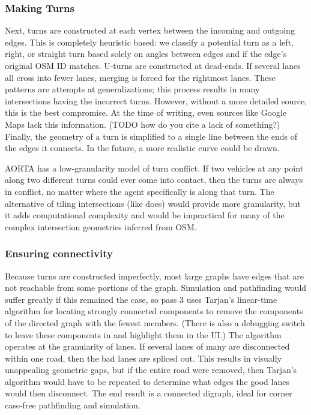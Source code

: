 \documentclass[letterpaper, 10 pt, conference]{ieeeconf}  %
\begin{document}
\subsubsection{Making Turns}

Next, turns are constructed at each vertex between the incoming and outgoing
edges. This is completely heuristic based: we classify a potential turn as a
left, right, or straight turn based solely on angles between edges and if the
edge's original OSM ID matches. U-turns are constructed at dead-ends. If several
lanes all cross into fewer lanes, merging is forced for the rightmost lanes.
These patterns are attempts at generalizations; this process results in many
intersections having the incorrect turns. However, without a more detailed
source, this is the best compromise. At the time of writing, even sources like
Google Maps lack this information. (TODO how do you cite a lack of something?)
Finally, the geometry of a turn is simplified to a single line between the ends
of the edges it connects.  In the future, a more realistic curve could be drawn.


AORTA has a low-granularity model of turn conflict. If two vehicles at any point
along two different turns could ever come into contact, then the turns are
always in conflict, no matter where the agent specifically is along that turn.
The alternative of tiling intersections (like \cite{JAIR08-dresner} does) would
provide more granularity, but it adds computational complexity and would be
impractical for many of the complex intersection geometries inferred from OSM.

\subsubsection{Ensuring connectivity}

Because turns are constructed imperfectly, most large graphs have edges that are
not reachable from some portions of the graph. Simulation and pathfinding would
suffer greatly if this remained the case, so pass 3 uses Tarjan's linear-time
algorithm for locating strongly connected components to remove the components of
the directed graph with the fewest members. (There is also a debugging switch to
leave these components in and highlight them in the UI.) The algorithm operates
at the granularity of lanes. If several lanes of many are disconnected within
one road, then the bad lanes are spliced out. This results in visually
unappealing geometric gaps, but if the entire road were removed, then Tarjan's
algorithm would have to be repeated to determine what edges the good lanes would
then disconnect. The end result is a connected digraph, ideal for corner
case-free pathfinding and simulation.
\end{document}
